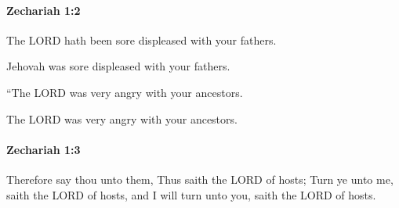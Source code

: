 		\paragraph{Zechariah 1:2} %
			\label{ZECHARIAH-1-2}

			The LORD hath been sore displeased with your fathers.

			\begin{versebox}
					\item[BHS] 
					\item[LXX] 
					\item[ASV] Jehovah was sore displeased with your fathers.
					\item[NIV] “The LORD was very angry with your ancestors.
					\item[NRSV] The LORD was very angry with your ancestors.
			\end{versebox}

		\paragraph{Zechariah 1:3} %
			\label{ZECHARIAH-1-3}

			Therefore say thou unto them, Thus saith the LORD of hosts; Turn ye unto me, saith the LORD of hosts, and I will turn unto you, saith the LORD of hosts.

